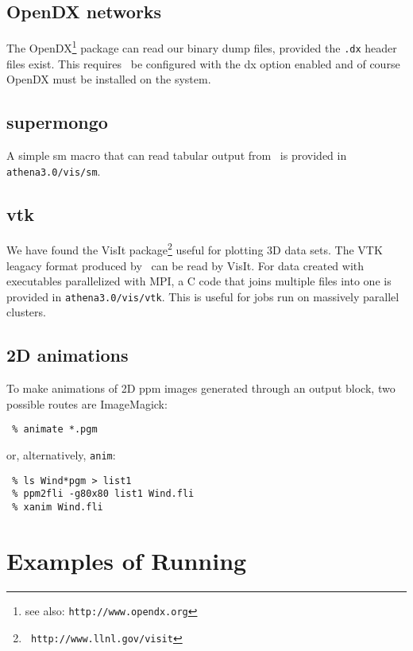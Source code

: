 \subsection{OpenDX networks}

The OpenDX\footnote{see also: {\tt http://www.opendx.org}} package can
read our binary dump files, provided the {\tt .dx} header files exist.
This requires \ath\ be configured with the dx option enabled and of
course OpenDX must be installed on the system.

\subsection{supermongo}

A simple sm macro that can read tabular output from \ath\ is provided
in {\tt athena3.0/vis/sm}.

\subsection{vtk}

We have found the VisIt package\footnote{{\tt
http://www.llnl.gov/visit}} useful for plotting 3D data sets.  The VTK leagacy
format produced by \ath\ can be read by VisIt.  For data created with
executables parallelized with MPI, a C code that joins multiple files into
one is provided in {\tt athena3.0/vis/vtk}.  This is useful for jobs run
on massively parallel clusters.

\subsection{2D animations}

To make animations of 2D ppm images generated through an output block,
two possible routes are ImageMagick:

\begin{verbatim}
 % animate *.pgm
\end{verbatim}

or, alternatively, {\tt anim}:
\begin{verbatim}
 % ls Wind*pgm > list1
 % ppm2fli -g80x80 list1 Wind.fli
 % xanim Wind.fli

\end{verbatim}

\section{Examples of Running \ath}

